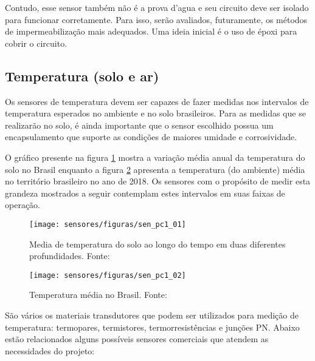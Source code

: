 	Contudo, esse sensor também não é a prova d'agua e seu circuito deve ser isolado para funcionar corretamente. Para isso, serão avaliados, futuramente, os métodos de impermeabilização mais adequados. Uma ideia inicial é o uso de époxi para cobrir o circuito.
	
	\subsection{Temperatura (solo e ar)}
		Os sensores de temperatura devem ser capazes de fazer medidas nos intervalos de temperatura esperados no ambiente e no solo brasileiros. Para as medidas que se realizarão no solo, é ainda importante que o sensor escolhido possua um encapsulamento que suporte as condições de maiores umidade e corrosividade. 
		
	O gráfico presente na figura \ref{sen_pc1_01} mostra a variação média anual da temperatura do solo no Brasil enquanto a figura \ref{sen_pc1_02} apresenta a temperatura (do ambiente) média no território brasileiro no ano de 2018. Os sensores com o propósito de medir esta grandeza mostrados a seguir contemplam estes intervalos em suas  faixas de operação.   
	
	\begin{figure}[H]
		\centering
		\texttt{[image: sensores/figuras/sen\_pc1\_01]}
		\caption{Media de temperatura do solo ao longo do tempo em duas diferentes profundidades. Fonte: \cite{bib_sen_02_paulo}}
		\label{sen_pc1_01}
	\end{figure}	 		

	\begin{figure}[H]
		\centering
		\texttt{[image: sensores/figuras/sen\_pc1\_02]}
		\caption{Temperatura média no Brasil. Fonte: \cite{bib_sen_03_inmet}}
		\label{sen_pc1_02}
	\end{figure}	 		

São vários os materiais transdutores que podem ser utilizados para medição de temperatura: termopares, termistores, termorresistências e junções PN. Abaixo estão relacionados alguns possíveis sensores comerciais que atendem as necessidades do projeto:

